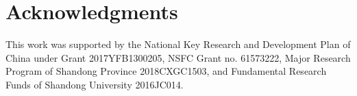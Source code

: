 \documentclass[letterpaper]{article} \usepackage{aaai19}  \usepackage{times}  \usepackage{helvet}  \usepackage{courier}  \usepackage{url}  \usepackage{graphicx}  \usepackage{color}
\begin{document}
\section*{Acknowledgments}
This work was supported by the National Key Research and Development Plan of China under Grant 2017YFB1300205, NSFC Grant no. 61573222, Major Research Program of Shandong Province 2018CXGC1503, and Fundamental Research Funds of Shandong University 2016JC014.





\small

\end{document}
